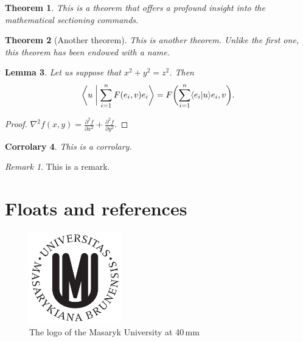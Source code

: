 \documentclass[
  digital, %
  table,   %
  lof,     %
  lot,     %
]{fithesis3}
\begin{document}
\newtheorem{theorem}{Theorem}[section] %
\newtheorem{lemma}[theorem]{Lemma}     %
\newtheorem{corr}[theorem]{Corrolary}  %
\theoremstyle{definition}
\newtheorem{definition}{Definition}
\theoremstyle{remark}
\newtheorem*{remark}{Remark}

\begin{theorem}
  This is a theorem that offers a profound insight into the
  mathematical sectioning commands.
\end{theorem}
\begin{theorem}[Another theorem]
  This is another theorem. Unlike the first one, this theorem has
  been endowed with a name.
\end{theorem}
\begin{lemma}
  Let us suppose that $x^2+y^2=z^2$. Then
  \begin{equation}
    \biggl\langle u\biggm|\sum_{i=1}^nF(e_i,v)e_i\biggr\rangle
    =F\biggl(\sum_{i=1}^n\langle e_i|u\rangle e_i,v\biggr).
  \end{equation}
\end{lemma}
\begin{proof}
  $\nabla^2 f(x,y)=\frac{\partial^2f}{\partial x^2}+
   \frac{\partial^2f}{\partial y^2}$.
\end{proof}
\begin{corr}
  This is a corrolary.
\end{corr}
\begin{remark}
  This is a remark.
\end{remark}

\chapter{Floats and references}
\begin{figure}
  \begin{center}
    \includegraphics[width=40mm]{fithesis/logo/mu/fithesis-base.pdf}
  \end{center}
  \caption{The logo of the Masaryk University at 40\,mm}
  \label{fig:mulogo1}
\end{figure}
\end{document}

